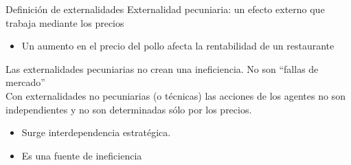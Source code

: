 \begin{frame}{Definición de externalidades}
Externalidad pecuniaria: un efecto externo que trabaja mediante los precios
	\begin{itemize}
		\item Un aumento en el precio del pollo afecta la rentabilidad de un restaurante
	\end{itemize}
Las externalidades pecuniarias no crean una ineficiencia. No son ``fallas de mercado''\\

Con externalidades no pecuniarias (o técnicas) las acciones de los agentes no son independientes y no son determinadas sólo por los precios.
	\begin{itemize}
		\item Surge interdependencia estratégica.
		\item Es una fuente de ineficiencia
	\end{itemize}
\end{frame}
